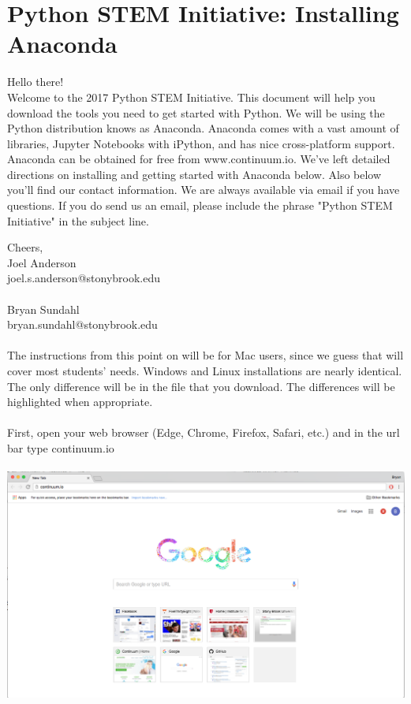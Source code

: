 \documentclass[]{article}
\begin{document}
\section*{Python STEM Initiative: Installing Anaconda}
Hello there! \\

Welcome to the 2017 Python STEM Initiative. This document will help you download the tools you need to get started with Python. We will be using the Python distribution knows as Anaconda. Anaconda comes with a vast amount of libraries, Jupyter Notebooks with iPython, and has nice cross-platform support. Anaconda can be obtained for free from www.continuum.io. We've left detailed directions on installing and getting started with Anaconda below. Also below you'll find our contact information. We are always available via email if you have questions. If you do send us an email, please include the phrase "Python STEM Initiative" in the subject line.

Cheers, \\

Joel Anderson \\
joel.s.anderson@stonybrook.edu\\ \\

Bryan Sundahl \\
bryan.sundahl@stonybrook.edu

\paragraph{}
The instructions from this point on will be for Mac users, since we guess that will cover most students' needs. Windows and Linux installations are nearly identical. The only difference will be in the file that you download. The differences will be highlighted when appropriate.
\paragraph{}
First, open your web browser (Edge, Chrome, Firefox, Safari, etc.) and in the url bar type continuum.io
\paragraph{}
\begin{centering}
    \centerline{\includegraphics[scale=0.25]{Screenshot_1.png}}
\end{centering}
\end{document}

